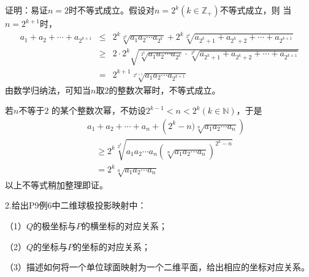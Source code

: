 证明：易证$n=2$时不等式成立。假设对$n=2^k(k\in\mathbb{Z}_+)$不等式成立，则
当$n=2^{k+1}$时，
\begin{eqnarray*}
	a_1+a_2+\cdots+a_{2^{k+1}}&\leq&2^k\sqrt[2^k]{a_1a_2\cdots a_{2^k}}
	+2^k\sqrt[2^k]{a_{2^k+1}+a_{2^k+2}+\cdots+a_{2^{k+1}}}\\
	&\geq&2\cdot 2^k\sqrt{\sqrt[2^k]{a_1a_2\cdots a_{2^k}}\cdot
	\sqrt[2^k]{a_{2^k+1}+a_{2^k+2}+\cdots+a_{2^{k+1}}}}\\
	&=&2^{k+1}\sqrt[2^{k+1}]{a_1a_2\cdots a_{2^{k+1}}}
\end{eqnarray*}
由数学归纳法，可知当$n$取$2$的整数次幂时，不等式成立。

若$n$不等于$2$
的某个整数次幂，不妨设$2^{k-1}<n<2^k(k\in\mathbb{N})$，于是
\begin{eqnarray*}
	& &a_1+a_2+\cdots+a_n+\left(2^k-n)\sqrt[n]{a_1a_2\cdots a_n}\right)\\
	& & \quad\geq 2^k\sqrt[2^k]{a_1a_2\cdots a_n\left(\sqrt[n]{a_1a_2\cdots
	a_n}\right)^{2^k-n}}\\
	& &\quad =2^k\sqrt[n]{a_1a_2\cdots a_n}
\end{eqnarray*}
以上不等式稍加整理即证。

\bigskip

2.给出P9例6中二维球极投影映射中：
  
（1）$Q$的极坐标与$P$的横坐标的对应关系；
  
（2）$Q$的坐标与$P$的坐标的对应关系；
  
（3）描述如何将一个单位球面映射为一个二维平面，给出相应的坐标对应关系。

